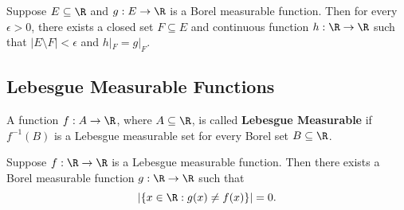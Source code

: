 \begin{prop}
    Suppose \( E \subseteq \R   \) and \( g: E \to \R  \) is a Borel measurable function. Then for every \( \epsilon > 0  \), there exists a closed set \( F \subseteq E  \) and continuous function \( h : \R \to \R  \) such that \( | E \setminus  F   |  < \epsilon \) and \( h |_{F} = g |_{F} \).
\end{prop}

\subsection{Lebesgue Measurable Functions}

\begin{definition}
    A function \( f: A \to \R  \), where \( A \subseteq  \R  \), is called \textbf{Lebesgue Measurable} if \( f^{-1}(B) \) is a Lebesgue measurable set for every Borel set \( B \subseteq \R  \).
\end{definition}

\begin{prop}
    Suppose \( f: \R \to \R  \) is a Lebesgue measurable function. Then there exists a Borel measurable function \( g: \R \to \R  \) such that 
    \[  | \{ x \in \R : g(x) \neq f(x) \}  | = 0. \]
\end{prop}

